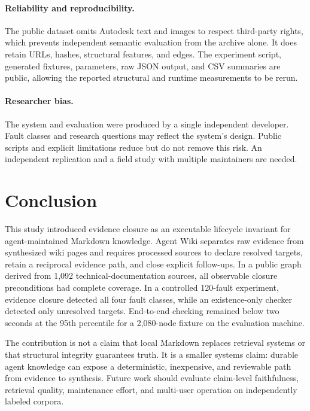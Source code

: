 \documentclass[preprint,12pt,a4paper]{elsarticle}
\begin{document}
\paragraph{Reliability and reproducibility.}
The public dataset omits Autodesk text and images to respect third-party rights,
which prevents independent semantic evaluation from the archive alone. It does
retain URLs, hashes, structural features, and edges. The experiment script,
generated fixtures, parameters, raw JSON output, and CSV summaries are public,
allowing the reported structural and runtime measurements to be rerun.

\paragraph{Researcher bias.}
The system and evaluation were produced by a single independent developer.
Fault classes and research questions may reflect the system's design. Public
scripts and explicit limitations reduce but do not remove this risk. An
independent replication and a field study with multiple maintainers are needed.

\section{Conclusion}

This study introduced evidence closure as an executable lifecycle invariant for
agent-maintained Markdown knowledge. Agent Wiki separates raw evidence from
synthesized wiki pages and requires processed sources to declare resolved
targets, retain a reciprocal evidence path, and close explicit follow-ups. In a
public graph derived from 1,092 technical-documentation sources, all observable
closure preconditions had complete coverage. In a controlled 120-fault
experiment, evidence closure detected all four fault classes, while an
existence-only checker detected only unresolved targets. End-to-end checking
remained below two seconds at the 95th percentile for a 2,080-node fixture on
the evaluation machine.

The contribution is not a claim that local Markdown replaces retrieval systems
or that structural integrity guarantees truth. It is a smaller systems claim:
durable agent knowledge can expose a deterministic, inexpensive, and
reviewable path from evidence to synthesis. Future work should evaluate
claim-level faithfulness, retrieval quality, maintenance effort, and multi-user
operation on independently labeled corpora.
\end{document}
